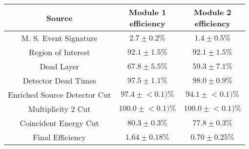 \begin{tabular}{|c|c|c|}
\hline
  Source & \makecell{Module 1\\efficiency} & \makecell{Module 2\\efficiency} \\
\hline
  M. S. Event Signature & $2.7 \pm 0.2\%$ & $1.4 \pm 0.5\%$ \\
  Region of Interest & $92.1 \pm 1.5\%$ & $92.1 \pm 1.5\%$ \\
  Dead Layer & $67.8 \pm 5.5\%$ & $59.3 \pm 7.1\%$ \\
  Detector Dead Times & $97.5 \pm 1.1\%$ & $98.0 \pm 0.9\%$ \\
  Enriched Source Detector Cut & $97.4 \pm{}<\!0.1)\%$ & $94.1 \pm{}<\!0.1)\%$ \\
  Multiplicity 2 Cut & $100.0 \pm{}<\!0.1)\%$ & $100.0 \pm{}<\!0.1)\%$ \\
  Coincident Energy Cut & $80.3 \pm 0.3\%$ & $77.8 \pm 0.3\%$ \\
  \hline Final Efficiency & $1.64 \pm 0.18\%$ & $0.70 \pm 0.25\%$ \\
\hline
\end{tabular}
